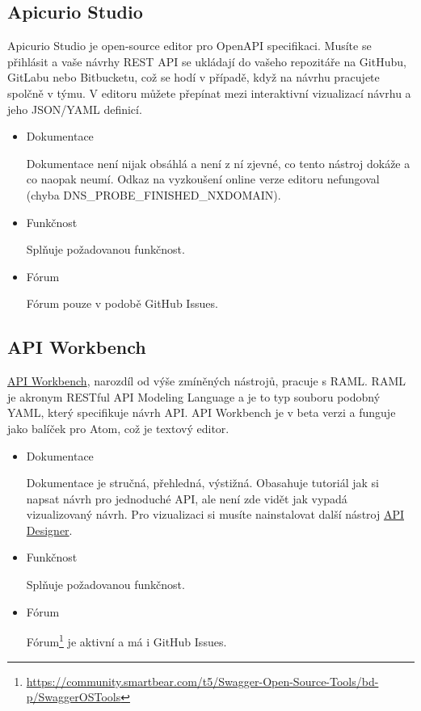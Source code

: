 \documentclass[thesis=B,czech]{FITthesis}[2012/06/26]
\begin{document}
        \subsection{Apicurio Studio}
            Apicurio Studio je open-source editor pro OpenAPI specifikaci. Musíte se přihlásit a vaše návrhy REST API se ukládají do vašeho repozitáře na GitHubu, GitLabu nebo Bitbucketu, což se hodí v případě, když na návrhu pracujete spolčně v týmu. V editoru můžete přepínat mezi interaktivní vizualizací návrhu a jeho JSON/YAML definicí.
            \begin{itemize}
                \item Dokumentace
                
                    Dokumentace není nijak obsáhlá a není z ní zjevné, co tento nástroj dokáže a co naopak neumí. Odkaz na vyzkoušení online verze editoru nefungoval (chyba DNS\_PROBE\_FINISHED\_NXDOMAIN).
                \item Funkčnost
                
                    Splňuje požadovanou funkčnost.
                \item Fórum
                
                    Fórum pouze v podobě GitHub Issues.
            \end{itemize}
            \cite{apicur}
        \subsection{API Workbench}
            \href{http://apiworkbench.com}{API Workbench}, narozdíl od výše zmíněných nástrojů, pracuje s RAML. RAML je akronym RESTful API Modeling Language a je to typ souboru podobný YAML, který specifikuje návrh API. API Workbench je v beta verzi a funguje jako balíček pro Atom, což je textový editor.
            
            \begin{itemize}
                \item Dokumentace
                
                    Dokumentace je stručná, přehledná, výstižná. Obasahuje tutoriál jak si napsat návrh pro jednoduché API, ale není zde vidět jak vypadá vizualizovaný návrh. Pro vizualizaci si musíte nainstalovat další nástroj \href{https://github.com/mulesoft/api-designer}{API Designer}.
                \item Funkčnost
                
                    Splňuje požadovanou funkčnost.
                \item Fórum
                
                    Fórum\footnote{\url{https://community.smartbear.com/t5/Swagger-Open-Source-Tools/bd-p/SwaggerOSTools}} je aktivní a má i GitHub Issues.       
            \end{itemize}
            \cite{apiworkbench}
\end{document}
